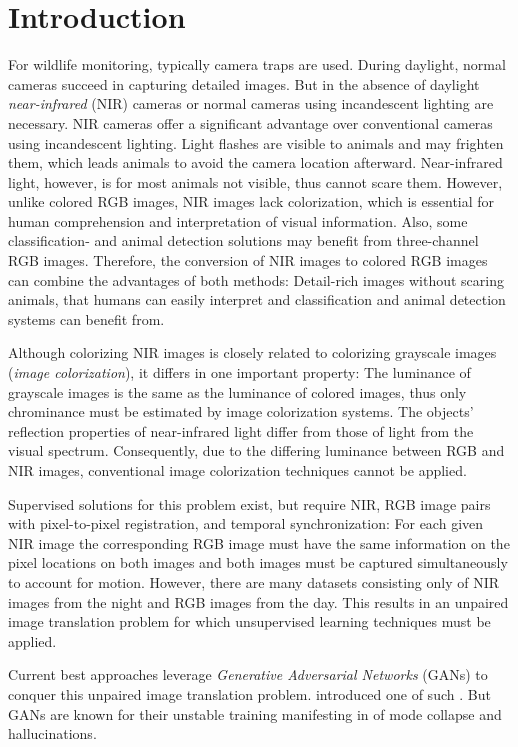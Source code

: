 \chapter{Introduction}
For wildlife monitoring, typically camera traps are used. During daylight, normal cameras succeed in capturing detailed images.
But in the absence of daylight \textit{near-infrared} (NIR) cameras or normal cameras using incandescent lighting are necessary.
NIR cameras offer a significant advantage over conventional cameras using incandescent lighting.
Light flashes are visible to animals and may frighten them, which leads animals to avoid the camera location afterward.
Near-infrared light, however, is for most animals not visible, thus cannot scare them.
However, unlike colored RGB images, NIR images lack colorization, which is essential for human comprehension and interpretation of visual information.
Also, some classification- and animal detection solutions may benefit from three-channel RGB images.
Therefore, the conversion of NIR images to colored RGB images can combine the advantages of both methods:
Detail-rich images without scaring animals, that humans can easily interpret and classification and animal detection systems can benefit from.

Although colorizing NIR images is closely related to colorizing grayscale images (\textit{image colorization}), it differs in one important property:
The luminance of grayscale images is the same as the luminance of colored images, thus only chrominance must be estimated by image colorization systems.
The objects' reflection properties of near-infrared light differ from those of light from the visual spectrum.
Consequently, due to the differing luminance between RGB and NIR images, conventional image colorization techniques cannot be applied.

Supervised solutions for this problem exist, but require NIR, RGB image pairs with pixel-to-pixel registration, and temporal synchronization:
For each given NIR image the corresponding RGB image must have the same information on the pixel locations on both images and both images must be captured simultaneously to account for motion.
However, there are many datasets consisting only of NIR images from the night and RGB images from the day.
This results in an unpaired image translation problem for which unsupervised learning techniques must be applied.

Current best approaches leverage \textit{Generative Adversarial Networks} (GANs) to conquer this unpaired image translation problem.
 introduced one of such \parencite{mehri}.
But GANs are known for their unstable training manifesting in of mode collapse and hallucinations.


